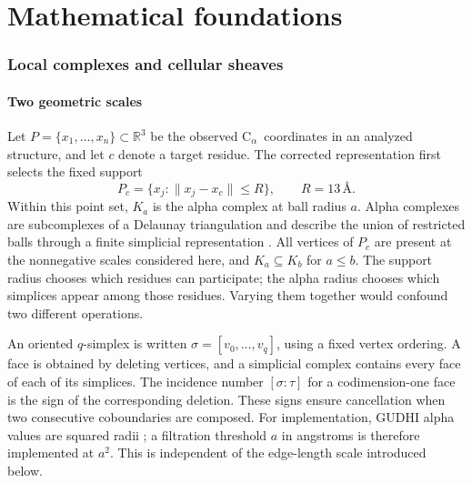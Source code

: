 \documentclass[11pt]{article}
\newcommand{\R}{\mathbb{R}}
\newcommand{\calpha}{C$_\alpha$}
\newcommand{\angstrom}{\text{\AA}}
\begin{document}

\FloatBarrier\clearpage\part{Mathematical foundations}

\section{Local complexes and cellular sheaves}
\subsection{Two geometric scales}
Let $P=\{x_1,\ldots,x_n\}\subset\R^3$ be the observed \calpha\ coordinates in an analyzed structure, and let $c$ denote a target residue. The corrected representation first selects the fixed support
\begin{equation}
P_c=\{x_j:\|x_j-x_c\|\leq R\},\qquad R=13\,\angstrom.
\label{eq:support}
\end{equation}
Within this point set, $K_a$ is the alpha complex at ball radius $a$. Alpha complexes are subcomplexes of a Delaunay triangulation and describe the union of restricted balls through a finite simplicial representation \citep{edelsbrunner1994}. All vertices of $P_c$ are present at the nonnegative scales considered here, and $K_a\subseteq K_b$ for $a\leq b$. The support radius chooses which residues can participate; the alpha radius chooses which simplices appear among those residues. Varying them together would confound two different operations.

An oriented $q$-simplex is written $\sigma=[v_0,\ldots,v_q]$, using a fixed vertex ordering. A face is obtained by deleting vertices, and a simplicial complex contains every face of each of its simplices. The incidence number $[\sigma:\tau]$ for a codimension-one face is the sign of the corresponding deletion. These signs ensure cancellation when two consecutive coboundaries are composed. For implementation, GUDHI alpha values are squared radii \citep{gudhi}; a filtration threshold $a$ in angstroms is therefore implemented at $a^2$. This is independent of the edge-length scale introduced below.


\end{document}

